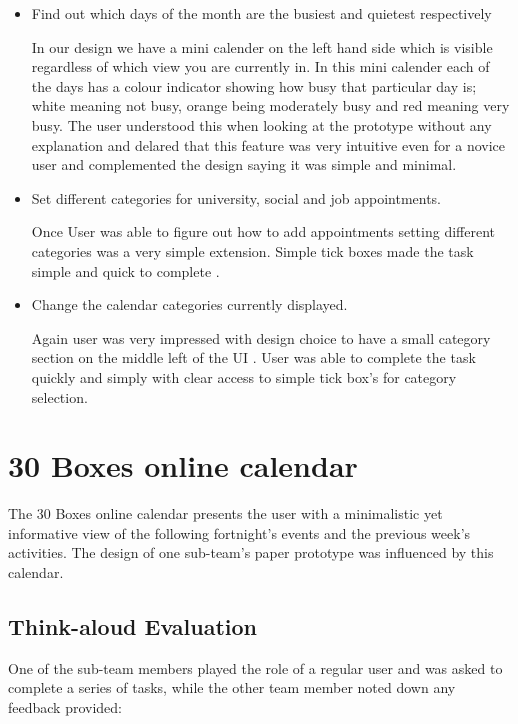 \documentclass{article}
\begin{document}
\begin{itemize}
\item Find out which days of the month are the busiest and quietest
respectively

In our design we have a mini calender on the left hand side which is 
visible regardless of which view you are currently in. In this mini
calender each of the days has a colour indicator showing how busy that
particular day is; white meaning not busy, orange being moderately
busy and red meaning very busy. The user understood this when looking
at the prototype without any explanation and delared that this feature
was very intuitive even for a novice user and complemented the design
saying it was simple and minimal.

\item Set different categories for university, social and job
appointments.

Once User was able to figure out how to add appointments setting
different categories was a very simple extension. Simple tick boxes
made the task simple and quick to complete .

\item Change the calendar categories currently displayed.

Again user was very impressed with design choice to have a small
category section on the middle left of the UI . User was able to
complete the task quickly and simply with clear access to simple tick
box's for category selection. 

\end{itemize}


\section{30 Boxes online calendar}

The 30 Boxes online calendar presents the user with a minimalistic yet
informative view of the following fortnight's events and the previous
week's activities. The design of one sub-team's paper prototype was
influenced by this calendar. 

\subsection{Think-aloud Evaluation}

One of the sub-team members played the role of a regular user and was
asked to complete a series of tasks, while the other team member noted
down any feedback provided:
\end{document}
